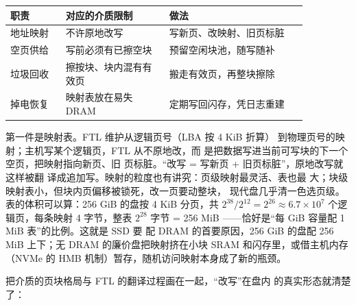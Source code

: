 \begin{longtable}{L{0.16\linewidth}L{0.3\linewidth}L{0.4\linewidth}}
\toprule
职责 & 对应的介质限制 & 做法 \\
\midrule
地址映射 & 不许原地改写 & 写新页、改映射、旧页标脏 \\\tablerowrule
空页供给 & 写前必须有已擦空块 & 预留空闲块池，随写随补 \\\tablerowrule
垃圾回收 & 擦按块、块内混有有效页 & 搬走有效页，再整块擦除 \\\tablerowrule
掉电恢复 & 映射表放在易失 DRAM & 定期写回闪存，凭日志重建 \\
\bottomrule
\end{longtable}

第一件是映射表。FTL 维护从逻辑页号（LBA 按 4 KiB 折算）
到物理页号的映射；主机写某个逻辑页，FTL 从不原地改，而
是把数据写进当前可写块的下一个空页，把映射指向新页、旧
页标脏。“改写 = 写新页 + 旧页标脏”，原地改写就这样被翻
译成追加写。映射的粒度也有讲究：页级映射最灵活、表也最
大；块级映射表小，但块内页偏移被锁死，改一页要动整块，
现代盘几乎清一色选页级。表的体积可以算：256 GiB 的盘按
4 KiB 分页，共 $2^{38}/2^{12}=2^{26}\approx6.7\times10^{7}$
个逻辑页，每条映射 4 字节，整表 $2^{28}$ 字节 = 256 MiB
——恰好是“每 GiB 容量配 1 MiB 表”的比例。这就是 SSD 要
配 DRAM 的首要原因，256 GiB 的盘配 256 MiB 上下；无 DRAM
的廉价盘把映射挤在小块 SRAM 和闪存里，或借主机内存
（NVMe 的 HMB 机制）暂存，随机访问映射本身成了新的瓶颈。

把介质的页块格局与 FTL 的翻译过程画在一起，“改写”在盘内
的真实形态就清楚了：

